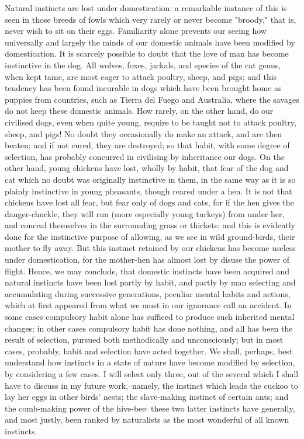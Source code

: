 Natural instincts are lost under domestication: a remarkable instance of this is seen in those breeds of fowls which very rarely or never become "broody," that is, never wish to sit on their eggs. Familiarity alone prevents our seeing how universally and largely the minds of our domestic animals have been modified by domestication. It is scarcely possible to doubt that the love of man has become instinctive in the dog. All wolves, foxes, jackals, and species of the cat genus, when kept tame, are most eager to attack poultry, sheep, and pigs; and this tendency has been found incurable in dogs which have been brought home as puppies from countries, such as Tierra del Fuego and Australia, where the savages do not keep these domestic animals. How rarely, on the other hand, do our civilised dogs, even when quite young, require to be taught not to attack poultry, sheep, and pigs! No doubt they occasionally do make an attack, and are then beaten; and if not cured, they are destroyed; so that habit, with some degree of selection, has probably concurred in civilising by inheritance our dogs. On the other hand, young chickens have lost, wholly by habit, that fear of the dog and cat which no doubt was originally instinctive in them, in the same way as it is so plainly instinctive in young pheasants, though reared under a hen. It is not that chickens have lost all fear, but fear only of dogs and cats, for if the hen gives the danger-chuckle, they will run (more especially young turkeys) from under her, and conceal themselves in the surrounding grass or thickets; and this is evidently done for the instinctive purpose of allowing, as we see in wild ground-birds, their mother to fly away. But this instinct retained by our chickens has become useless under domestication, for the mother-hen has almost lost by disuse the power of flight.
Hence, we may conclude, that domestic instincts have been acquired and natural instincts have been lost partly by habit, and partly by man selecting and accumulating during successive generations, peculiar mental habits and actions, which at first appeared from what we must in our ignorance call an accident. In some cases compulsory habit alone has sufficed to produce such inherited mental changes; in other cases compulsory habit has done nothing, and all has been the result of selection, pursued both methodically and unconsciously; but in most cases, probably, habit and selection have acted together.
We shall, perhaps, best understand how instincts in a state of nature have become modified by selection, by considering a few cases. I will select only three, out of the several which I shall have to discuss in my future work,--namely, the instinct which leads the cuckoo to lay her eggs in other birds' nests; the slave-making instinct of certain ants; and the comb-making power of the hive-bee: these two latter instincts have generally, and most justly, been ranked by naturalists as the most wonderful of all known instincts.
